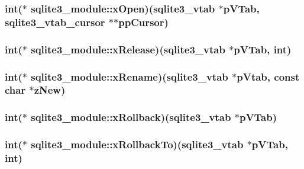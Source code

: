 \hypertarget{structsqlite3__module_a2cb9f8c149617189efa6ceec0a3211e9}{
\subsubsection[{x\-Open}]{\setlength{\rightskip}{0pt plus 5cm}int($\ast$ sqlite3\-\_\-module\-::x\-Open)({\bf sqlite3\-\_\-vtab} $\ast$p\-V\-Tab, {\bf sqlite3\-\_\-vtab\-\_\-cursor} $\ast$$\ast$pp\-Cursor)}}\label{structsqlite3__module_a2cb9f8c149617189efa6ceec0a3211e9}
\hypertarget{structsqlite3__module_a8dcaa6dc6d9563c8da57e4c8c5055609}{
\subsubsection[{x\-Release}]{\setlength{\rightskip}{0pt plus 5cm}int($\ast$ sqlite3\-\_\-module\-::x\-Release)({\bf sqlite3\-\_\-vtab} $\ast$p\-V\-Tab, int)}}\label{structsqlite3__module_a8dcaa6dc6d9563c8da57e4c8c5055609}
\hypertarget{structsqlite3__module_af886782e9a1ea5c4b131b2bc373c8092}{
\subsubsection[{x\-Rename}]{\setlength{\rightskip}{0pt plus 5cm}int($\ast$ sqlite3\-\_\-module\-::x\-Rename)({\bf sqlite3\-\_\-vtab} $\ast$p\-Vtab, const char $\ast$z\-New)}}\label{structsqlite3__module_af886782e9a1ea5c4b131b2bc373c8092}
\hypertarget{structsqlite3__module_a3f8676e941a3080557fe10528e04e2f1}{
\subsubsection[{x\-Rollback}]{\setlength{\rightskip}{0pt plus 5cm}int($\ast$ sqlite3\-\_\-module\-::x\-Rollback)({\bf sqlite3\-\_\-vtab} $\ast$p\-V\-Tab)}}\label{structsqlite3__module_a3f8676e941a3080557fe10528e04e2f1}
\hypertarget{structsqlite3__module_a767753c6c97d1f622e5113367a0547b5}{
\subsubsection[{x\-Rollback\-To}]{\setlength{\rightskip}{0pt plus 5cm}int($\ast$ sqlite3\-\_\-module\-::x\-Rollback\-To)({\bf sqlite3\-\_\-vtab} $\ast$p\-V\-Tab, int)}}\label{structsqlite3__module_a767753c6c97d1f622e5113367a0547b5}
